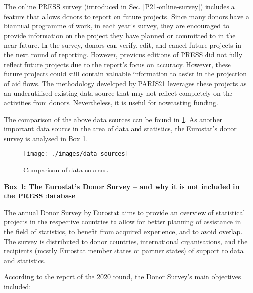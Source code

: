 \documentclass[
]{article}
\begin{document}
The online PRESS survey (introduced in Sec. \ref{P21-online-survey}) includes a feature that allows donors to report on
future projects. Since many donors have a biannual programme of work, in each year's survey, they
are encouraged to provide information on the project they have planned or committed to in the near
future. In the survey, donors can verify, edit, and cancel future projects in the next round of reporting.
However, previous editions of PRESS did not fully reflect future projects due to the report's focus on
accuracy. However, these future projects could still contain valuable information to assist in the
projection of aid flows. The methodology developed by PARIS21 leverages these projects as an
underutilised existing data source that may not reflect completely on the activities from donors.
Nevertheless, it is useful for nowcasting funding.

The comparison of the above data sources can be found in \ref{fig:data-sources}. As another important data
source in the area of data and statistics, the Eurostat's donor survey is analysed in Box 1.

\begin{figure}

{\centering \texttt{[image: ./images/data\_sources]} 

}

\caption{Comparison of data sources.}\label{fig:data-sources}
\end{figure}

\begin{center}
\textbf{Box 1: The Eurostat's Donor Survey -- and why it is not included in the PRESS database}

\end{center}

The annual Donor Survey by Eurostat aims to provide an overview of statistical projects in the
respective countries to allow for better planning of assistance in the field of statistics, to benefit
from acquired experience, and to avoid overlap. The survey is distributed to donor countries,
international organisations, and the recipients (mostly Eurostat member states or partner
states) of support to data and statistics.

According to the report of the 2020 round, the Donor Survey's main objectives included:
\end{document}
